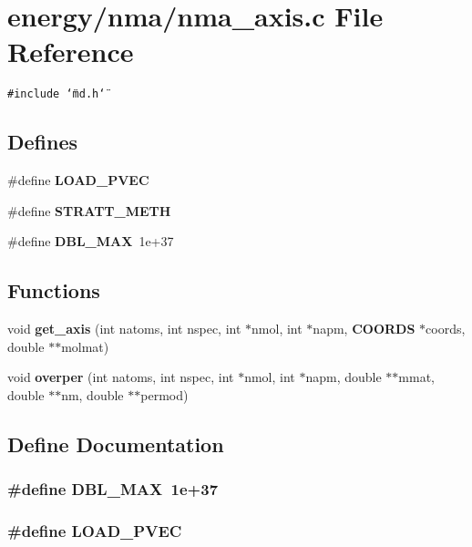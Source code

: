 \section{energy/nma/nma\_\-axis.c File Reference}
\label{nma__axis_8c}
{\tt \#include \char`\"{}md.h\char`\"{}}\par
\subsection*{Defines}
\begin{CompactItemize}
\item 
\#define {\bf LOAD\_\-PVEC}
\item 
\#define {\bf STRATT\_\-METH}
\item 
\#define {\bf DBL\_\-MAX}~1e+37
\end{CompactItemize}
\subsection*{Functions}
\begin{CompactItemize}
\item 
void {\bf get\_\-axis} (int natoms, int nspec, int $\ast$nmol, int $\ast$napm, {\bf COORDS} $\ast$coords, double $\ast$$\ast$molmat)
\item 
void {\bf overper} (int natoms, int nspec, int $\ast$nmol, int $\ast$napm, double $\ast$$\ast$mmat, double $\ast$$\ast$nm, double $\ast$$\ast$permod)
\end{CompactItemize}


\subsection{Define Documentation}
\subsubsection{\setlength{\rightskip}{0pt plus 5cm}\#define DBL\_\-MAX~1e+37}\label{nma__axis_8c_f78670ee54c1203d613f8fb0e022d214}


\subsubsection{\setlength{\rightskip}{0pt plus 5cm}\#define LOAD\_\-PVEC}\label{nma__axis_8c_123415e1ff1f1499e049aecba8cce4cf}


